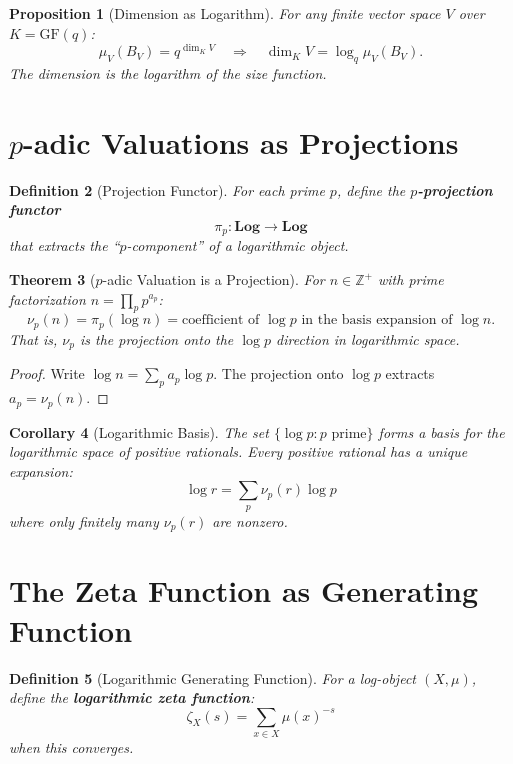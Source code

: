 \documentclass[11pt]{article}
\newtheorem{definition}{Definition}[section]
\newtheorem{theorem}[definition]{Theorem}
\newtheorem{proposition}[definition]{Proposition}
\newtheorem{corollary}[definition]{Corollary}
\begin{document}
\begin{proposition}[Dimension as Logarithm]
For any finite vector space $V$ over $K = \text{GF}(q)$:
\[
\mu_V(B_V) = q^{\dim_K V} \quad \Longrightarrow \quad \dim_K V = \log_q \mu_V(B_V).
\]
The dimension is the logarithm of the size function.
\end{proposition}

\section{$p$-adic Valuations as Projections}
\label{sec:padic}

\begin{definition}[Projection Functor]
For each prime $p$, define the \textbf{$p$-projection functor}
\[
\pi_p: \mathbf{Log} \to \mathbf{Log}
\]
that extracts the ``$p$-component'' of a logarithmic object.
\end{definition}

\begin{theorem}[$p$-adic Valuation is a Projection]
For $n \in \mathbb{Z}^+$ with prime factorization $n = \prod_p p^{a_p}$:
\[
\nu_p(n) = \pi_p(\log n) = \text{coefficient of } \log p \text{ in the basis expansion of } \log n.
\]
That is, $\nu_p$ is the projection onto the $\log p$ direction in logarithmic space.
\end{theorem}

\begin{proof}
Write $\log n = \sum_p a_p \log p$. The projection onto $\log p$ extracts $a_p = \nu_p(n)$.
\end{proof}

\begin{corollary}[Logarithmic Basis]
The set $\{\log p : p \text{ prime}\}$ forms a basis for the logarithmic space of positive rationals. Every positive rational has a unique expansion:
\[
\log r = \sum_p \nu_p(r) \log p
\]
where only finitely many $\nu_p(r)$ are nonzero.
\end{corollary}

\section{The Zeta Function as Generating Function}
\label{sec:zeta}

\begin{definition}[Logarithmic Generating Function]
For a log-object $(X, \mu)$, define the \textbf{logarithmic zeta function}:
\[
\zeta_X(s) = \sum_{x \in X} \mu(x)^{-s}
\]
when this converges.
\end{definition}
\end{document}
